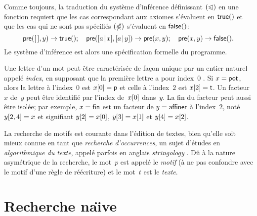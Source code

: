 
Comme toujours, la traduction du système d'inférence définissant
\((\mathord{\trianglelefteqslant})\) en une fonction 
requiert que les cas correspondant aux axiomes s'évaluent en
\(\textsf{true}()\) et que les cas qui ne sont pas spécifiés
\((\mathord{\ntrianglelefteqslant})\) s'évaluent en \(\textsf{false}()\):
\begin{equation*}
\textsf{pre}([\,],y) \rightarrow \textsf{true}();\quad
\textsf{pre}([{a}\!\mid\!{x}],[{a}\!\mid\!{y}]) \rightarrow \textsf{pre}(x,y);\quad
\textsf{pre}(x,y) \rightarrow \textsf{false}().
\end{equation*}
Le système d'inférence est alors une spécification formelle du
programme.

Une lettre d'un mot peut être caractérisée de façon unique par un
entier naturel appelé \emph{index},
en supposant que la première lettre a pour index~\(0\)
\citep{Dijkstra_1982}. Si \(x=\textsf{pot}\), alors la lettre à
l'index~\(0\) est \({x}[{0}]=\textsf{p}\) et celle à l'index~\(2\) est
\({x}[{2}]=\textsf{t}\). Un facteur~\(x\) de~\(y\) peut être identifié
par l'index de~\({x}[{0}]\) dans~\(y\). La fin du facteur peut aussi
être isolée; par exemple, \(x=\textsf{fin}\) est un facteur de
\(y=\textsf{affiner}\) à l'index~\(2\), noté \({y}[{2,4}] = x\) et
signifiant \({y}[{2}] = {x}[{0}]\), \({y}[{3}] = {x}[{1}]\) et
\({y}[{4}] = {x}[{2}]\).

La recherche de motifs est courante dans l'édition de textes, bien
qu'elle soit mieux connue en tant que \emph{recherche d'occurrences},
un sujet d'études en \emph{algorithmique du texte}, appelé parfois en
anglais \emph{stringology}
\citep{CharrasLecroq_2004,CrochemoreHancartLecroq_2007}
\citep[\S{}32]{CLRS_2009}. Dû à la nature asymétrique de la recherche,
le mot~\(p\) est appelé le \emph{motif} (à ne pas confondre avec le motif d'une règle de
réécriture) et le mot~\(t\) est le \emph{texte}.

\section{Recherche na\"{\i}ve}
\label{sec:naive_factoring}

